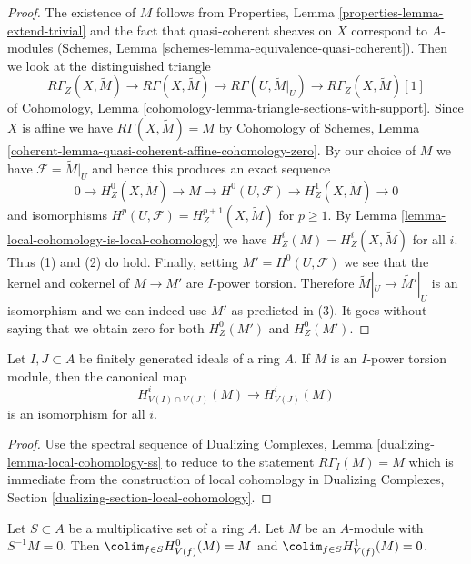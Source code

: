 \begin{proof}
The existence of $M$ follows from
Properties, Lemma \ref{properties-lemma-extend-trivial}
and the fact that quasi-coherent sheaves on $X$ correspond
to $A$-modules (Schemes, Lemma \ref{schemes-lemma-equivalence-quasi-coherent}).
Then we look at the distinguished triangle
$$
R\Gamma_Z(X, \widetilde{M}) \to R\Gamma(X, \widetilde{M}) \to
R\Gamma(U, \widetilde{M}|_U) \to R\Gamma_Z(X, \widetilde{M})[1]
$$
of Cohomology, Lemma \ref{cohomology-lemma-triangle-sections-with-support}.
Since $X$ is affine we have $R\Gamma(X, \widetilde{M}) = M$
by Cohomology of Schemes, Lemma
\ref{coherent-lemma-quasi-coherent-affine-cohomology-zero}.
By our choice of $M$ we have $\mathcal{F} = \widetilde{M}|_U$
and hence this produces an exact sequence
$$
0 \to H^0_Z(X, \widetilde{M}) \to M \to H^0(U, \mathcal{F}) \to
H^1_Z(X, \widetilde{M}) \to 0
$$
and isomorphisms $H^p(U, \mathcal{F}) = H^{p + 1}_Z(X, \widetilde{M})$
for $p \geq 1$. By Lemma \ref{lemma-local-cohomology-is-local-cohomology}
we have $H^i_Z(M) = H^i_Z(X, \widetilde{M})$ for all $i$.
Thus (1) and (2) do hold.
Finally, setting $M' = H^0(U, \mathcal{F})$ we see that
the kernel and cokernel of $M \to M'$ are $I$-power torsion.
Therefore $\widetilde{M}|_U \to \widetilde{M'}|_U$ is an isomorphism
and we can indeed use $M'$ as predicted in (3). It goes without saying
that we obtain zero for both $H^0_Z(M')$ and $H^0_Z(M')$.
\end{proof}

\begin{lemma}
\label{lemma-already-torsion}
Let $I, J \subset A$ be finitely generated ideals of a ring $A$.
If $M$ is an $I$-power torsion module, then the
canonical map
$$
H^i_{V(I) \cap V(J)}(M) \to H^i_{V(J)}(M)
$$
is an isomorphism for all $i$.
\end{lemma}

\begin{proof}
Use the spectral sequence of
Dualizing Complexes, Lemma \ref{dualizing-lemma-local-cohomology-ss}
to reduce to the statement $R\Gamma_I(M) = M$ which is immediate
from the construction of local cohomology
in Dualizing Complexes, Section \ref{dualizing-section-local-cohomology}.
\end{proof}

\begin{lemma}
\label{lemma-multiplicative}
Let $S \subset A$ be a multiplicative set of a ring $A$.
Let $M$ be an $A$-module with $S^{-1}M = 0$. Then
$\colim_{f \in S} H^0_{V(f)}(M) = M$ and
$\colim_{f \in S} H^1_{V(f)}(M) = 0$.
\end{lemma}

